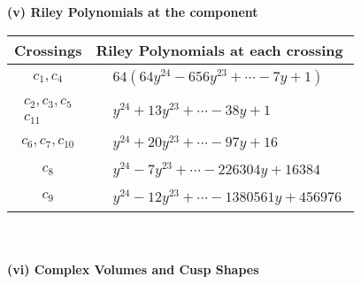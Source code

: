 \documentclass[1p]{elsarticle_modified}
\theoremstyle{definition}
\begin{document}
\newpage\renewcommand{\arraystretch}{1}
\flushleft \textbf{(v) Riley Polynomials at the component}\newline \\
\begin{tabular}{m{50pt}|m{274pt}}
Crossings & \hspace{64pt}Riley Polynomials at each crossing \\
\hline $$\begin{aligned}c_{1},c_{4}\end{aligned}$$&$\begin{aligned}
&64(64 y^{24}-656 y^{23}+\cdots-7 y+1)
\end{aligned}$\\
\hline $$\begin{aligned}c_{2},c_{3},c_{5}\\c_{11}\end{aligned}$$&$\begin{aligned}
&y^{24}+13 y^{23}+\cdots-38 y+1
\end{aligned}$\\
\hline $$\begin{aligned}c_{6},c_{7},c_{10}\end{aligned}$$&$\begin{aligned}
&y^{24}+20 y^{23}+\cdots-97 y+16
\end{aligned}$\\
\hline $$\begin{aligned}c_{8}\end{aligned}$$&$\begin{aligned}
&y^{24}-7 y^{23}+\cdots-226304 y+16384
\end{aligned}$\\
\hline $$\begin{aligned}c_{9}\end{aligned}$$&$\begin{aligned}
&y^{24}-12 y^{23}+\cdots-1380561 y+456976
\end{aligned}$\\
\hline
\end{tabular}\\~\\
\newpage\flushleft \textbf{(vi) Complex Volumes and Cusp Shapes}
\end{document}
